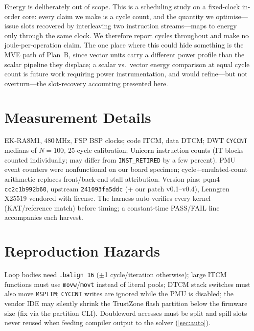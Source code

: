 \documentclass[11pt,a4paper]{article}
\begin{document}
Energy is deliberately out of scope. This is a scheduling study on a
fixed-clock in-order core: every claim we make is a cycle count, and the
quantity we optimise---issue slots recovered by interleaving two instruction
streams---maps to energy only through the same clock. We therefore report
cycles throughout and make no joule-per-operation claim. The one place where
this could hide something is the MVE path of Plan~B, since vector units carry
a different power profile than the scalar pipeline they displace; a scalar
vs.\ vector energy comparison at equal cycle count is future work requiring
power instrumentation, and would refine---but not overturn---the slot-recovery
accounting presented here.

\printbibliography

\appendix
\section{Measurement Details}
EK-RA8M1, 480\,MHz, FSP BSP clocks; code ITCM, data DTCM; DWT \texttt{CYCCNT}
medians of $N{=}100$, 25-cycle calibration; Unicorn instruction counts (IT
blocks counted individually; may differ from \texttt{INST\_RETIRED} by a few
percent). PMU event counters were nonfunctional on our board specimen;
cycle+emulated-count arithmetic replaces front/back-end stall attribution.
Version pins: pqm4 \texttt{cc2c1b992b60}, upstream \slothy{}
\texttt{241093fa5ddc} (+ our patch v0.1--v0.4), Lenngren X25519 vendored with
license. The harness auto-verifies every kernel (KAT/reference match) before
timing; a constant-time PASS/FAIL line accompanies each harvest.

\section{Reproduction Hazards}
Loop bodies need \texttt{.balign 16} ($\pm$1 cycle/iteration otherwise); large
ITCM functions must use \texttt{movw}/\texttt{movt} instead of literal pools;
DTCM stack switches must also move \texttt{MSPLIM}; \texttt{CYCCNT} writes are
ignored while the PMU is disabled; the vendor IDE may silently shrink the
TrustZone flash partition below the firmware size (fix via the partition CLI).
Doubleword accesses must be split and spill slots never reused when feeding
compiler output to the solver (\cref{sec:auto}).
\end{document}
